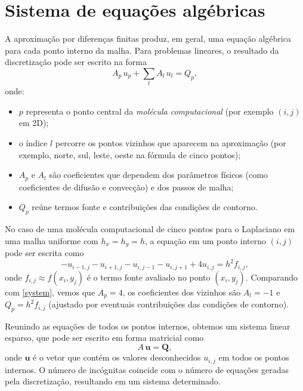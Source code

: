\section{Sistema de equações algébricas}

A aproximação por diferenças finitas produz, em geral, uma equação algébrica
para cada ponto interno da malha. Para problemas lineares, o resultado da 
discretização pode ser escrito na forma
\begin{equation}
\label{system}
A_p \,u_p + \sum_{l} A_l \,u_l = Q_p,
\end{equation}
onde:
\begin{itemize}
    \item $p$ representa o ponto central da \emph{molécula computacional}
    (por exemplo $(i,j)$ em 2D);
    \item o índice $l$ percorre os pontos vizinhos que aparecem na 
    aproximação (por exemplo, norte, sul, leste, oeste na fórmula de cinco pontos);
    \item $A_p$ e $A_l$ são coeficientes que dependem dos parâmetros físicos 
    (como coeficientes de difusão e convecção) e dos passos de malha;
    \item $Q_p$ reúne termos fonte e contribuições das condições de contorno.
\end{itemize}

No caso de uma molécula computacional de cinco pontos para o Laplaciano em 
uma malha uniforme com $h_x = h_y = h$, a equação em um ponto interno $(i,j)$ 
pode ser escrita como
\begin{equation}
\label{system_laplace_2d}
- u_{i-1,j} - u_{i+1,j} - u_{i,j-1} - u_{i,j+1} + 4u_{i,j}
= h^2 f_{i,j},
\end{equation}
onde $f_{i,j} \approx f(x_i,y_j)$ é o termo fonte avaliado no ponto 
$(x_i,y_j)$. Comparando com \eqref{system}, vemos que $A_p = 4$, os 
coeficientes dos vizinhos são $A_l = -1$ e $Q_p = h^2 f_{i,j}$ (ajustado por 
eventuais contribuições das condições de contorno).

Reunindo as equações de todos os pontos internos, obtemos um sistema linear
esparso, que pode ser escrito em forma matricial como
\begin{equation}
\label{system_matrix}
A\,\bm{u} = \bm{Q},
\end{equation}
onde $\bm{u}$ é o vetor que contém os valores desconhecidos 
$u_{i,j}$ em todos os pontos internos. O número de incógnitas coincide
com o número de equações geradas pela discretização, resultando em um 
sistema determinado.



